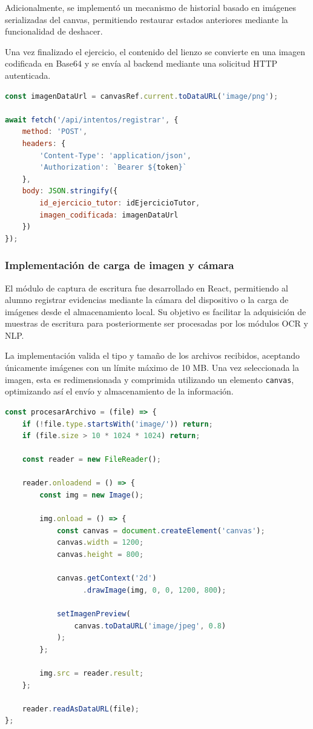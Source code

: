 Adicionalmente, se implementó un mecanismo de historial basado en imágenes serializadas del canvas, permitiendo restaurar estados anteriores mediante la funcionalidad de deshacer.

Una vez finalizado el ejercicio, el contenido del lienzo se convierte en una imagen codificada en Base64 y se envía al backend mediante una solicitud HTTP autenticada.

\begin{lstlisting}[language=JavaScript, caption={Exportación y envío del dibujo al backend}]
const imagenDataUrl = canvasRef.current.toDataURL('image/png');

await fetch('/api/intentos/registrar', {
    method: 'POST',
    headers: {
        'Content-Type': 'application/json',
        'Authorization': `Bearer ${token}`
    },
    body: JSON.stringify({
        id_ejercicio_tutor: idEjercicioTutor,
        imagen_codificada: imagenDataUrl
    })
});
\end{lstlisting}

\subsubsection{Implementación de carga de imagen y cámara}

El módulo de captura de escritura fue desarrollado en React, permitiendo al alumno registrar evidencias mediante la cámara del dispositivo o la carga de imágenes desde el almacenamiento local. Su objetivo es facilitar la adquisición de muestras de escritura para posteriormente ser procesadas por los módulos OCR y NLP.

La implementación valida el tipo y tamaño de los archivos recibidos, aceptando únicamente imágenes con un límite máximo de 10 MB. Una vez seleccionada la imagen, esta es redimensionada y comprimida utilizando un elemento \texttt{canvas}, optimizando así el envío y almacenamiento de la información.

\begin{lstlisting}[language=JavaScript, caption={Procesamiento y validación de imágenes}]
const procesarArchivo = (file) => {
    if (!file.type.startsWith('image/')) return;
    if (file.size > 10 * 1024 * 1024) return;

    const reader = new FileReader();

    reader.onloadend = () => {
        const img = new Image();

        img.onload = () => {
            const canvas = document.createElement('canvas');
            canvas.width = 1200;
            canvas.height = 800;

            canvas.getContext('2d')
                  .drawImage(img, 0, 0, 1200, 800);

            setImagenPreview(
                canvas.toDataURL('image/jpeg', 0.8)
            );
        };

        img.src = reader.result;
    };

    reader.readAsDataURL(file);
};
\end{lstlisting}

